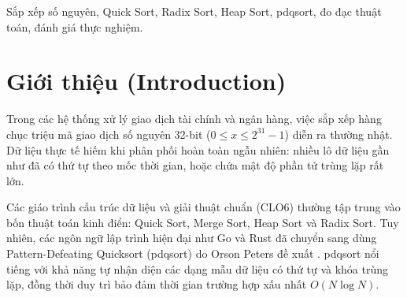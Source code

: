 \documentclass[conference]{IEEEtran}
\begin{document}
\begin{abstract}
Việc sắp xếp hiệu quả các mảng khóa số nguyên quy mô lớn đóng vai trò nền tảng trong các hệ thống đối soát dữ liệu và xử lý giao dịch thông lượng cao. Trong khi các môi trường thực thi ngôn ngữ hiện đại (như Go, Rust) đã chuyển đổi sang các thuật toán lai thích ứng như Pattern-Defeating Quicksort (pdqsort), giáo trình đại học chuẩn chủ yếu nhấn mạnh các thuật toán kinh điển gồm Quick Sort, Merge Sort, Heap Sort và Radix Sort. Nghiên cứu này cung cấp một so sánh thực nghiệm có kiểm soát chặt chẽ trên năm phân phối dữ liệu đặc thù ($D_1$--$D_5$) với quy mô mở rộng từ $10^5$ đến $2\times 10^7$ phần tử. Chúng tôi đánh giá toàn diện thời gian thực thi, dung lượng bộ nhớ đỉnh, số lượng thao tác cơ bản và độ sâu đệ quy theo giao thức đo chuẩn hội nghị IEEE. Đồng thời, nghiên cứu khảo sát pdqsort cùng các biến thể triệt tiêu cơ chế nhận diện mẫu (noA và noB). Kết quả cho thấy Radix Sort đạt tốc độ tăng trưởng dưới tuyến tính ổn định trên mọi phân phối đầu vào, trong khi Heap Sort bảo đảm nghiêm ngặt bộ nhớ phụ $O(1)$ nhưng chịu suy giảm hiệu năng do tổn thất truy cập bộ nhớ đệm phi cục bộ. Đáng chú ý, pdqsort thích nghi với các mảng đã có thứ tự trong thời gian gần như tuyến tính ($O(N)$) và loại bỏ hoàn toàn sự suy thoái khi gặp khóa trùng lặp nhờ phân hoạch ba chiều, cung cấp các tiêu chí điều kiện rõ ràng để lựa chọn thuật toán trong các hệ thống thực tế.
\end{abstract}

\begin{IEEEkeywords}
Sắp xếp số nguyên, Quick Sort, Radix Sort, Heap Sort, pdqsort, đo đạc thuật toán, đánh giá thực nghiệm.
\end{IEEEkeywords}

\section{Giới thiệu (Introduction)}
Trong các hệ thống xử lý giao dịch tài chính và ngân hàng, việc sắp xếp hàng chục triệu mã giao dịch số nguyên 32-bit ($0 \le x \le 2^{31}-1$) diễn ra thường nhật. Dữ liệu thực tế hiếm khi phân phối hoàn toàn ngẫu nhiên: nhiều lô dữ liệu gần như đã có thứ tự theo mốc thời gian, hoặc chứa mật độ phần tử trùng lặp rất lớn.

Các giáo trình cấu trúc dữ liệu và giải thuật chuẩn (CLO6) thường tập trung vào bốn thuật toán kinh điển: Quick Sort, Merge Sort, Heap Sort và Radix Sort. Tuy nhiên, các ngôn ngữ lập trình hiện đại như Go và Rust đã chuyển sang dùng Pattern-Defeating Quicksort (pdqsort) do Orson Peters đề xuất \cite{peters2021pdqsort}. pdqsort nổi tiếng với khả năng tự nhận diện các dạng mẫu dữ liệu có thứ tự và khóa trùng lặp, đồng thời duy trì bảo đảm thời gian trường hợp xấu nhất $O(N \log N)$.
\end{document}
